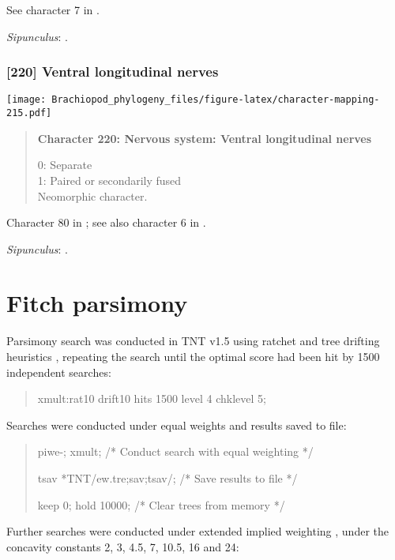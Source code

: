 \documentclass[openany]{book}
\theoremstyle{definition}
\theoremstyle{definition}
\theoremstyle{definition}
\theoremstyle{remark}
\begin{document}
See character 7 in \citet{Haszprunar2008}.

\hypertarget{Sipunculus-coding-219}{}
\emph{Sipunculus}: \citet{Temereva2016Thenervous}.

\subsection*{{[}220{]} Ventral longitudinal
nerves}\label{ventral-longitudinal-nerves}

\texttt{[image: Brachiopod\_phylogeny\_files/figure-latex/character-mapping-215.pdf]}

\begin{quote}
\textbf{Character 220: Nervous system: Ventral longitudinal nerves}

0: Separate\\
1: Paired or secondarily fused\\
Neomorphic character.
\end{quote}

Character 80 in \citet{Glenner2004}; see also character 6 in
\citet{Vinther2008}.

\hypertarget{Sipunculus-coding-220}{}
\emph{Sipunculus}: \citet{Temereva2016Thenervous}.

\hypertarget{fitch}{\chapter{Fitch parsimony}\label{fitch}}

Parsimony search was conducted in TNT v1.5 \citep{Goloboff2016} using
ratchet and tree drifting heuristics \citep{Goloboff1999, Nixon1999},
repeating the search until the optimal score had been hit by 1500
independent searches:

\begin{quote}
xmult:rat10 drift10 hits 1500 level 4 chklevel 5;
\end{quote}

Searches were conducted under equal weights and results saved to file:

\begin{quote}
piwe-; xmult; {/* Conduct search with equal weighting */}

tsav *TNT/ew.tre;sav;tsav/; {/* Save results to file */}

keep 0; hold 10000; {/* Clear trees from memory */}
\end{quote}

Further searches were conducted under extended implied weighting
\citep{Goloboff1997, Goloboff2014}, under the concavity constants 2, 3,
4.5, 7, 10.5, 16 and 24:
\end{document}
